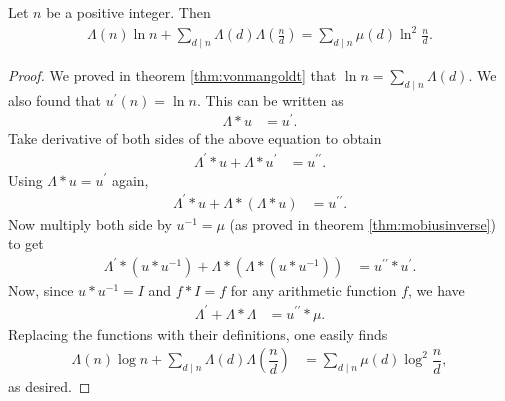 \documentclass{subfile}
\begin{document}
	\begin{theorem}
		Let $n$ be a positive integer. Then
			\begin{align*}
				\Lambda(n)\ln n+\sum_{d\mid n}\Lambda(d)\Lambda\left(\frac nd\right)=\sum_{d\mid n}\mu(d)\ln^2\frac nd.
			\end{align*}
	\end{theorem}
	\begin{proof}
		We proved in theorem \eqref{thm:vonmangoldt} that $\ln n=\sum_{d\mid n}\Lambda(d)$. We also found that $u^\prime(n) = \ln n$. This can be written as
			\begin{align*}
				\Lambda\ast u & =u^\prime.
			\end{align*}
		Take derivative of both sides of the above equation to obtain
			\begin{align*}
				\Lambda^\prime\ast u+\Lambda\ast u^\prime & =u^{\prime\prime}.
			\end{align*}
		Using $\Lambda\ast u  =u^\prime$ again,
			\begin{align*}
				\Lambda^\prime\ast u+\Lambda\ast(\Lambda\ast u) & =u^{\prime\prime}.
			\end{align*}
		Now multiply both side by $u^{-1}=\mu$ (as proved in theorem \eqref{thm:mobiusinverse}) to get
			\begin{align*}
				\Lambda^\prime\ast(u\ast u^{-1})+\Lambda\ast(\Lambda\ast(u\ast u^{-1}))
					& =u^{\prime\prime}\ast u^\prime.
			\end{align*}
		Now, since $u \ast u^{-1} = I$ and $f \ast I = f$ for any arithmetic function $f$, we have
			\begin{align*}
				\Lambda^\prime+\Lambda\ast\Lambda & =u^{\prime\prime}\ast\mu.
			\end{align*}
		Replacing the functions with their definitions, one easily finds
			\begin{align*}
				\Lambda(n)\log n+\sum_{d\mid n}\Lambda(d)\Lambda\left(\dfrac nd\right) & =\sum_{d\mid n}\mu(d)\log^2\dfrac nd,
			\end{align*}
		as desired.
	\end{proof}
\end{document}
